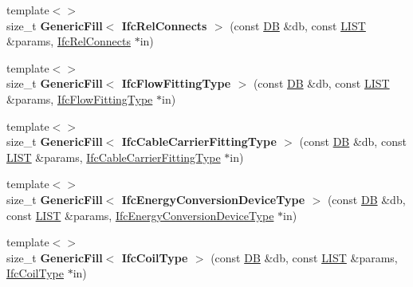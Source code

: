 \begin{DoxyCompactItemize}
\item 
\hypertarget{namespace_assimp_1_1_s_t_e_p_a5bd350b3382549a0acb1867c87191603}{{\footnotesize template$<$$>$ }\\size\+\_\+t {\bfseries Generic\+Fill$<$ Ifc\+Rel\+Connects $>$} (const \hyperlink{class_assimp_1_1_s_t_e_p_1_1_d_b}{D\+B} \&db, const \hyperlink{class_assimp_1_1_s_t_e_p_1_1_e_x_p_r_e_s_s_1_1_l_i_s_t}{L\+I\+S\+T} \&params, \hyperlink{struct_assimp_1_1_i_f_c_1_1_ifc_rel_connects}{Ifc\+Rel\+Connects} $\ast$in)}\label{namespace_assimp_1_1_s_t_e_p_a5bd350b3382549a0acb1867c87191603}

\item 
\hypertarget{namespace_assimp_1_1_s_t_e_p_a47a178bba65f3b78d7bde62edb0f2e89}{{\footnotesize template$<$$>$ }\\size\+\_\+t {\bfseries Generic\+Fill$<$ Ifc\+Flow\+Fitting\+Type $>$} (const \hyperlink{class_assimp_1_1_s_t_e_p_1_1_d_b}{D\+B} \&db, const \hyperlink{class_assimp_1_1_s_t_e_p_1_1_e_x_p_r_e_s_s_1_1_l_i_s_t}{L\+I\+S\+T} \&params, \hyperlink{struct_assimp_1_1_i_f_c_1_1_ifc_flow_fitting_type}{Ifc\+Flow\+Fitting\+Type} $\ast$in)}\label{namespace_assimp_1_1_s_t_e_p_a47a178bba65f3b78d7bde62edb0f2e89}

\item 
\hypertarget{namespace_assimp_1_1_s_t_e_p_a5998f9fb36fbc3056827aa884f5ef1c4}{{\footnotesize template$<$$>$ }\\size\+\_\+t {\bfseries Generic\+Fill$<$ Ifc\+Cable\+Carrier\+Fitting\+Type $>$} (const \hyperlink{class_assimp_1_1_s_t_e_p_1_1_d_b}{D\+B} \&db, const \hyperlink{class_assimp_1_1_s_t_e_p_1_1_e_x_p_r_e_s_s_1_1_l_i_s_t}{L\+I\+S\+T} \&params, \hyperlink{struct_assimp_1_1_i_f_c_1_1_ifc_cable_carrier_fitting_type}{Ifc\+Cable\+Carrier\+Fitting\+Type} $\ast$in)}\label{namespace_assimp_1_1_s_t_e_p_a5998f9fb36fbc3056827aa884f5ef1c4}

\item 
\hypertarget{namespace_assimp_1_1_s_t_e_p_ac69b89bedab66b445ac6b03ac6c53bfc}{{\footnotesize template$<$$>$ }\\size\+\_\+t {\bfseries Generic\+Fill$<$ Ifc\+Energy\+Conversion\+Device\+Type $>$} (const \hyperlink{class_assimp_1_1_s_t_e_p_1_1_d_b}{D\+B} \&db, const \hyperlink{class_assimp_1_1_s_t_e_p_1_1_e_x_p_r_e_s_s_1_1_l_i_s_t}{L\+I\+S\+T} \&params, \hyperlink{struct_assimp_1_1_i_f_c_1_1_ifc_energy_conversion_device_type}{Ifc\+Energy\+Conversion\+Device\+Type} $\ast$in)}\label{namespace_assimp_1_1_s_t_e_p_ac69b89bedab66b445ac6b03ac6c53bfc}

\item 
\hypertarget{namespace_assimp_1_1_s_t_e_p_a67b36cf8b2d75f2a4ffb2986e12fc52a}{{\footnotesize template$<$$>$ }\\size\+\_\+t {\bfseries Generic\+Fill$<$ Ifc\+Coil\+Type $>$} (const \hyperlink{class_assimp_1_1_s_t_e_p_1_1_d_b}{D\+B} \&db, const \hyperlink{class_assimp_1_1_s_t_e_p_1_1_e_x_p_r_e_s_s_1_1_l_i_s_t}{L\+I\+S\+T} \&params, \hyperlink{struct_assimp_1_1_i_f_c_1_1_ifc_coil_type}{Ifc\+Coil\+Type} $\ast$in)}\label{namespace_assimp_1_1_s_t_e_p_a67b36cf8b2d75f2a4ffb2986e12fc52a}


\end{DoxyCompactItemize}
